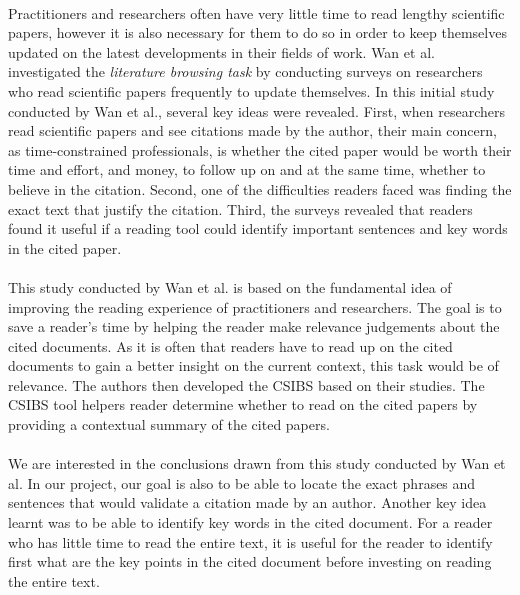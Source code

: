 \documentclass[12 pt]{article}
\begin{document}
\paragraph{}
Practitioners and researchers often have very little time to read lengthy scientific papers, however it is also necessary for them to do so in order to keep themselves updated on the latest developments in their fields of work. Wan et al.\cite{citation-sensitive} investigated the \textit{literature browsing task} by conducting surveys on researchers who read scientific papers frequently to update themselves. In this initial study conducted by Wan et al., several key ideas were revealed. First, when researchers read scientific papers and see citations made by the author, their main concern, as time-constrained professionals, is whether the cited paper would be worth their time and effort, and money, to follow up on and at the same time, whether to believe in the citation. Second, one of the difficulties readers faced was finding the exact text that justify the citation. Third, the surveys revealed that readers found it useful if a reading tool could identify important sentences and key words in the cited paper.

\paragraph{}
This study conducted by Wan et al. is based on the fundamental idea of improving the reading experience of practitioners and researchers. The goal is to save a reader's time by helping the reader make relevance judgements about the cited documents. As it is often that readers have to read up on the cited documents to gain a better insight on the current context, this task would be of relevance. The authors then developed the CSIBS\cite{csibs} based on their studies. The CSIBS tool helpers reader determine whether to read on the cited papers by providing a contextual summary of the cited papers.

\paragraph{}
We are interested in the conclusions drawn from this study conducted by Wan et al. In our project, our goal is also to be able to locate the exact phrases and sentences that would validate a citation made by an author. Another key idea learnt was to be able to identify key words in the cited document. For a reader who has little time to read the entire text, it is useful for the reader to identify first what are the key points in the cited document before investing on reading the entire text.
\end{document}
